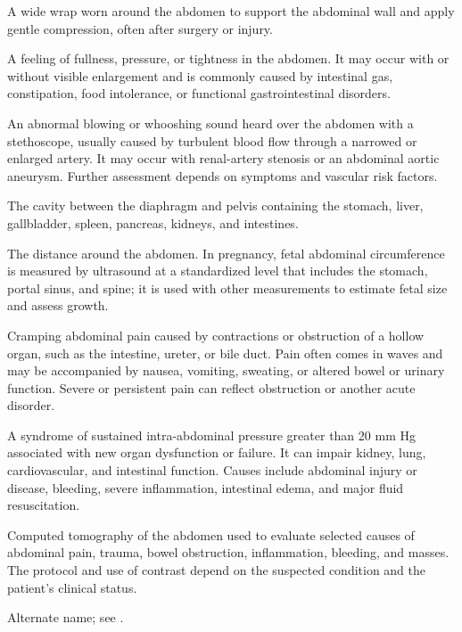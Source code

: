  A wide wrap worn around the abdomen to support the abdominal wall and apply gentle compression, often after surgery or injury.

 A feeling of fullness, pressure, or tightness in the abdomen. It may occur with or without visible enlargement and is commonly caused by intestinal gas, constipation, food intolerance, or functional gastrointestinal disorders.

 An abnormal blowing or whooshing sound heard over the abdomen with a stethoscope,
usually caused by turbulent blood flow through a narrowed or enlarged artery. It may occur with
renal-artery stenosis or an abdominal aortic aneurysm. Further assessment depends on symptoms and
vascular risk factors.

 The cavity between the diaphragm and pelvis containing the stomach, liver, gallbladder,
spleen, pancreas, kidneys, and intestines.

 The distance around the abdomen. In pregnancy, fetal abdominal circumference is measured by ultrasound at a standardized level that includes the stomach, portal sinus, and spine; it is used with other measurements to estimate fetal size and assess growth.

 Cramping abdominal pain caused by contractions or obstruction of a hollow organ, such as the intestine, ureter, or bile duct. Pain often comes in waves and may be accompanied by nausea, vomiting, sweating, or altered bowel or urinary function. Severe or persistent pain can reflect obstruction or another acute disorder.

 A syndrome of sustained intra-abdominal pressure greater than 20 mm Hg associated with new organ dysfunction or failure. It can impair kidney, lung, cardiovascular, and intestinal function. Causes include abdominal injury or disease, bleeding, severe inflammation, intestinal edema, and major fluid resuscitation.

 Computed tomography of the abdomen used to evaluate selected causes of abdominal pain, trauma,
bowel obstruction, inflammation, bleeding, and masses. The protocol and use of contrast
depend on the suspected condition and the patient's clinical status.

 Alternate name; see .

